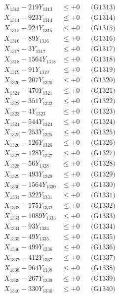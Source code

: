 \documentclass[a4paper,10pt]{article}
\begin{document}
{\begin{align}
X_{1313} - 219Y_{1313} &\leq +0 && \text{(G1313)} \\
X_{1314} - 923Y_{1314} &\leq +0 && \text{(G1314)} \\
X_{1315} - 924Y_{1315} &\leq +0 && \text{(G1315)} \\
X_{1316} - 89Y_{1316} &\leq +0 && \text{(G1316)} \\
X_{1317} - 3Y_{1317} &\leq +0 && \text{(G1317)} \\
X_{1318} - 1564Y_{1318} &\leq +0 && \text{(G1318)} \\
X_{1319} - 91Y_{1319} &\leq +0 && \text{(G1319)} \\
X_{1320} - 207Y_{1320} &\leq +0 && \text{(G1320)} \\
\allowbreak
X_{1321} - 470Y_{1321} &\leq +0 && \text{(G1321)} \\
X_{1322} - 351Y_{1322} &\leq +0 && \text{(G1322)} \\
X_{1323} - 4Y_{1323} &\leq +0 && \text{(G1323)} \\
X_{1324} - 544Y_{1324} &\leq +0 && \text{(G1324)} \\
X_{1325} - 253Y_{1325} &\leq +0 && \text{(G1325)} \\
X_{1326} - 126Y_{1326} &\leq +0 && \text{(G1326)} \\
X_{1327} - 128Y_{1327} &\leq +0 && \text{(G1327)} \\
X_{1328} - 56Y_{1328} &\leq +0 && \text{(G1328)} \\
X_{1329} - 493Y_{1329} &\leq +0 && \text{(G1329)} \\
X_{1330} - 1564Y_{1330} &\leq +0 && \text{(G1330)} \\
\allowbreak
X_{1331} - 322Y_{1331} &\leq +0 && \text{(G1331)} \\
X_{1332} - 175Y_{1332} &\leq +0 && \text{(G1332)} \\
X_{1333} - 1089Y_{1333} &\leq +0 && \text{(G1333)} \\
X_{1334} - 93Y_{1334} &\leq +0 && \text{(G1334)} \\
X_{1335} - 49Y_{1335} &\leq +0 && \text{(G1335)} \\
X_{1336} - 499Y_{1336} &\leq +0 && \text{(G1336)} \\
X_{1337} - 412Y_{1337} &\leq +0 && \text{(G1337)} \\
X_{1338} - 964Y_{1338} &\leq +0 && \text{(G1338)} \\
X_{1339} - 267Y_{1339} &\leq +0 && \text{(G1339)} \\
X_{1340} - 330Y_{1340} &\leq +0 && \text{(G1340)} \\

\end{align}}
\end{document}
